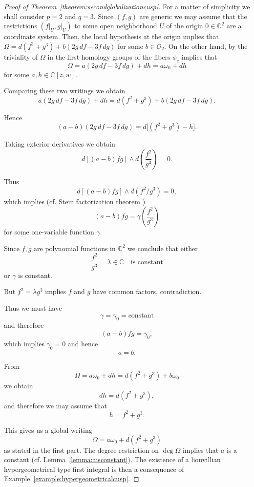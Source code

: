 \documentclass[11pt,a4paper]{amsart}
\theoremstyle{definition}
\begin{document}
\begin{proof}[Proof of Theorem~\ref{theorem:secondglobalizationcusp}]
For a matter of simplicity we shall consider $p=2$ and $q=3$.
Since $(f,g)$ are generic we may assume that the restrictions $(f\big|_U, g\big|_U)$ to some 
open neighborhood $U$ of the origin $0 \in \mathbb C^2$ are a coordinate system. 
Then, the local hypothesis at the origin implies that 
$\Omega = d(f^2+g^3) + b(2g\,df - 3f\,dg)$ for some $b \in \mathcal O_2$.
On the other hand, by the triviality of $\Omega$ in the first homology groups 
of the fibers $\phi_c$ implies that 
\[
\Omega= a(2g\,df - 3f\,dg) + dh= a \omega_0 + dh
\]
for some $a, h \in \mathbb C[z,w]$.  

Comparing these two writings we obtain
\[
a(2g\,df - 3f\,dg) + dh
=
d(f^2+g^3) + b(2g\,df - 3f\,dg).
\]

Hence
\[
(a-b)(2g\,df - 3f\,dg)
=
d\big[(f^2+g^3) - h\big].
\]

Taking exterior derivatives we obtain
\[
d\!\left[(a-b)fg\right]
\wedge
d\!\left(\frac{f^2}{g^3}\right)
=0.
\]

Thus
\[
d[(a-b)fg] \wedge d(f^2/g^3)=0,
\]
which implies (cf. Stein factorization theorem \cite{Gr-Re})
\[
(a-b)fg = \gamma\!\left(\frac{f^2}{g^3}\right)
\]
for some one-variable function $\gamma$.

Since $f,g$ are polynomial functions in $\mathbb{C}^2$
we conclude that either
\[
\frac{f^2}{g^3}=\lambda \in \mathbb{C}
\quad\text{is constant}
\]
or $\gamma$ is constant.



But $f^2=\lambda g^3$ implies $f$ and $g$ have common
factors, contradiction.

Thus we must have
\[
\gamma=\gamma_0=\text{constant}
\]
and therefore
\[
(a-b)fg=\gamma_0,
\]
which implies $\gamma_0=0$ and hence
\[
a=b.
\]

From
\[
\Omega = a\omega_0 + dh
=
d(f^2+g^3) + b\omega_0
\]
we obtain
\[
dh = d(f^2+g^3),
\]
and therefore we may assume that
\[
h = f^2 + g^3.
\]

This gives us a global writing 
\[
\Omega = a\omega_0 + d(f^2+g^3)
\]
as stated in the first part. The degree restriction on $\deg \Omega$ implies that 
$a$ is a constant (cf. Lemma~\ref{lemma:aisconstant}).  The existence of a liouvillian hypergeometrical type first integral is then a consequence of Example~\ref{example:hypergeometricalcusp}.  

\end{proof}
\end{document}
